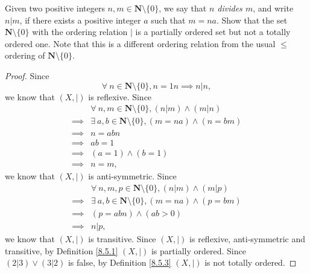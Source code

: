 \begin{exercise}\label{ex 8.5.3}
    Given two positive integers \(n, m \in \mathbf{N} \setminus \{0\}\), we say that \emph{\(n\) divides \(m\)}, and write \(n | m\), if there exists a positive integer \(a\) such that \(m = na\).
    Show that the set \(\mathbf{N} \setminus \{0\}\) with the ordering relation \(|\) is a partially ordered set but not a totally ordered one.
    Note that this is a different ordering relation from the usual \(\leq\) ordering of \(\mathbf{N} \setminus \{0\}\).
\end{exercise}

\begin{proof}
    Since
    \[
        \forall\ n \in \mathbf{N} \setminus \{0\}, n = 1n \implies n | n,
    \]
    we know that \((X, |)\) is reflexive.
    Since
    \begin{align*}
                 & \forall\ n, m \in \mathbf{N} \setminus \{0\}, (n | m) \land (m | n)   \\
        \implies & \exists\ a, b \in \mathbf{N} \setminus \{0\}, (m = na) \land (n = bm) \\
        \implies & n = abn                                                               \\
        \implies & ab = 1                                                                \\
        \implies & (a = 1) \land (b = 1)                                                 \\
        \implies & n = m,
    \end{align*}
    we know that \((X, |)\) is anti-symmetric.
    Since
    \begin{align*}
                 & \forall\ n, m, p \in \mathbf{N} \setminus \{0\}, (n | m) \land (m | p) \\
        \implies & \exists\ a, b \in \mathbf{N} \setminus \{0\}, (m = na) \land (p = bm)  \\
        \implies & (p = abn) \land (ab > 0)                                               \\
        \implies & n | p,
    \end{align*}
    we know that \((X, |)\) is transitive.
    Since \((X, |)\) is reflexive, anti-symmetric and transitive, by Definition \ref{8.5.1} \((X, |)\) is partially ordered.
    Since \((2 | 3) \lor (3 | 2)\) is false, by Definition \ref{8.5.3} \((X, |)\) is not totally ordered.
\end{proof}

